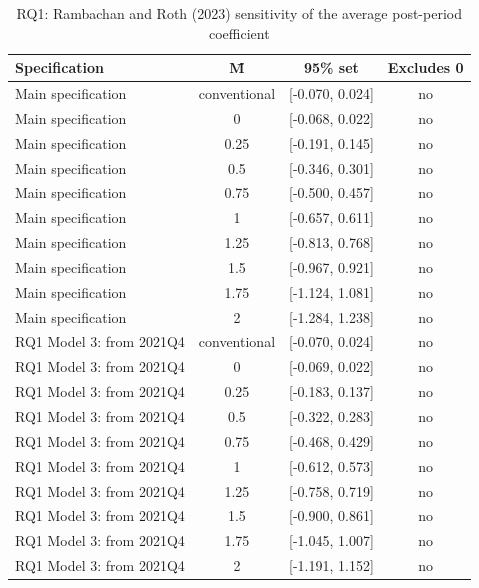 \begin{table}[htbp]\centering
\caption{RQ1: Rambachan and Roth (2023) sensitivity of the average post-period coefficient}
\begin{tabular}{lccc}
\toprule
Specification & M̄ & 95\% set & Excludes 0 \\
\midrule
Main specification & conventional & [-0.070, 0.024] & no \\
Main specification & 0 & [-0.068, 0.022] & no \\
Main specification & 0.25 & [-0.191, 0.145] & no \\
Main specification & 0.5 & [-0.346, 0.301] & no \\
Main specification & 0.75 & [-0.500, 0.457] & no \\
Main specification & 1 & [-0.657, 0.611] & no \\
Main specification & 1.25 & [-0.813, 0.768] & no \\
Main specification & 1.5 & [-0.967, 0.921] & no \\
Main specification & 1.75 & [-1.124, 1.081] & no \\
Main specification & 2 & [-1.284, 1.238] & no \\
RQ1 Model 3: from 2021Q4 & conventional & [-0.070, 0.024] & no \\
RQ1 Model 3: from 2021Q4 & 0 & [-0.069, 0.022] & no \\
RQ1 Model 3: from 2021Q4 & 0.25 & [-0.183, 0.137] & no \\
RQ1 Model 3: from 2021Q4 & 0.5 & [-0.322, 0.283] & no \\
RQ1 Model 3: from 2021Q4 & 0.75 & [-0.468, 0.429] & no \\
RQ1 Model 3: from 2021Q4 & 1 & [-0.612, 0.573] & no \\
RQ1 Model 3: from 2021Q4 & 1.25 & [-0.758, 0.719] & no \\
RQ1 Model 3: from 2021Q4 & 1.5 & [-0.900, 0.861] & no \\
RQ1 Model 3: from 2021Q4 & 1.75 & [-1.045, 1.007] & no \\
RQ1 Model 3: from 2021Q4 & 2 & [-1.191, 1.152] & no \\
\bottomrule
\end{tabular}
\par\vspace{2pt}{\footnotesize Relative-magnitudes restriction: each change in the parallel-trends violation between consecutive post-period quarters is at most M̄ times the largest such change between consecutive pre-period quarters (including the change into the reference quarter). Robust sets from the HonestDiD R package (step 08); the breakdown M̄ is the largest M̄ at which zero is excluded.}
\end{table}
